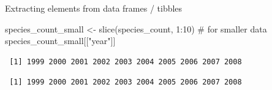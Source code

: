 \documentclass[
  ignorenonframetext,
  aspectratio=169,
]{beamer}
\newenvironment{Shaded}{\begin{snugshade}}{\end{snugshade}}
\newcommand{\CommentTok}[1]{\textcolor[rgb]{0.37,0.37,0.37}{#1}}
\newcommand{\DecValTok}[1]{\textcolor[rgb]{0.68,0.00,0.00}{#1}}
\newcommand{\FunctionTok}[1]{\textcolor[rgb]{0.28,0.35,0.67}{#1}}
\newcommand{\NormalTok}[1]{\textcolor[rgb]{0.00,0.23,0.31}{#1}}
\newcommand{\OtherTok}[1]{\textcolor[rgb]{0.00,0.23,0.31}{#1}}
\newcommand{\SpecialCharTok}[1]{\textcolor[rgb]{0.37,0.37,0.37}{#1}}
\newcommand{\StringTok}[1]{\textcolor[rgb]{0.13,0.47,0.30}{#1}}
\begin{document}
\begin{frame}[fragile]{Extracting elements from data frames / tibbles}
\protect{}\label{extracting-elements-from-data-frames-tibbles-2}
\footnotesize

\begin{Shaded}
\begin{Highlighting}[]
\NormalTok{species\_count\_small }\OtherTok{\textless{}{-}} \FunctionTok{slice}\NormalTok{(species\_count, }\DecValTok{1}\SpecialCharTok{:}\DecValTok{10}\NormalTok{) }\CommentTok{\# for smaller data}
\NormalTok{species\_count\_small[[}\StringTok{"year"}\NormalTok{]]}
\end{Highlighting}
\end{Shaded}

\begin{verbatim}
 [1] 1999 2000 2001 2002 2003 2004 2005 2006 2007 2008
\end{verbatim}

\begin{Shaded}
\end{Shaded}

\begin{verbatim}
 [1] 1999 2000 2001 2002 2003 2004 2005 2006 2007 2008
\end{verbatim}

\normalsize
\end{frame}
\end{document}
